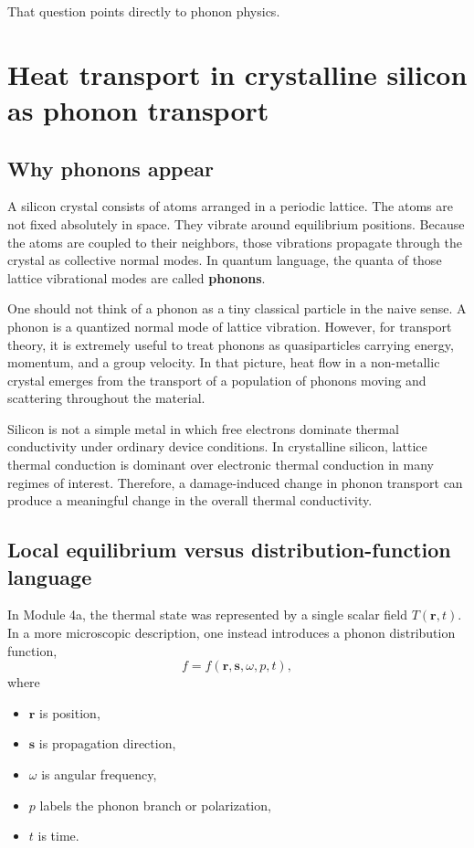 \documentclass[11pt]{article}
\newcommand{\rvec}{\mathbf{r}}
\begin{document}
That question points directly to phonon physics.

\section{Heat transport in crystalline silicon as phonon transport}

\subsection{Why phonons appear}

A silicon crystal consists of atoms arranged in a periodic lattice. The atoms are not fixed absolutely in space. They vibrate around equilibrium positions. Because the atoms are coupled to their neighbors, those vibrations propagate through the crystal as collective normal modes. In quantum language, the quanta of those lattice vibrational modes are called \textbf{phonons}.

One should not think of a phonon as a tiny classical particle in the naive sense. A phonon is a quantized normal mode of lattice vibration. However, for transport theory, it is extremely useful to treat phonons as quasiparticles carrying energy, momentum, and a group velocity. In that picture, heat flow in a non-metallic crystal emerges from the transport of a population of phonons moving and scattering throughout the material.

Silicon is not a simple metal in which free electrons dominate thermal conductivity under ordinary device conditions. In crystalline silicon, lattice thermal conduction is dominant over electronic thermal conduction in many regimes of interest. Therefore, a damage-induced change in phonon transport can produce a meaningful change in the overall thermal conductivity.

\subsection{Local equilibrium versus distribution-function language}

In Module 4a, the thermal state was represented by a single scalar field $T(\rvec,t)$. In a more microscopic description, one instead introduces a phonon distribution function,
\[
 f = f(\rvec,\mathbf{s},\omega,p,t),
\]
where
\begin{itemize}
    \item $\rvec$ is position,
    \item $\mathbf{s}$ is propagation direction,
    \item $\omega$ is angular frequency,
    \item $p$ labels the phonon branch or polarization,
    \item $t$ is time.
\end{itemize}
\end{document}
